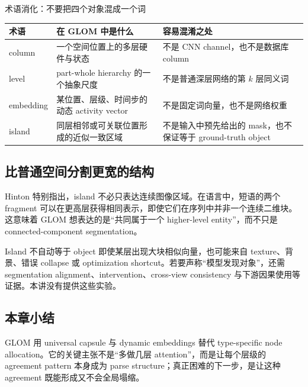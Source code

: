 \begin{knowledgebox}{术语消化：不要把四个对象混成一个词}
\begin{tabularx}{\textwidth}{L{0.21\textwidth}L{0.29\textwidth}X}
\toprule
术语 & 在 GLOM 中是什么 & 容易混淆之处 \\
\midrule
column & 一个空间位置上的多层硬件与状态 & 不是 CNN channel，也不是数据库 column \\
level & part-whole hierarchy 的一个抽象尺度 & 不是普通深层网络的第 $k$ 层同义词 \\
embedding & 某位置、层级、时间步的动态 activity vector & 不是固定词向量，也不是网络权重 \\
island & 同层相邻或可关联位置形成的近似一致区域 & 不是输入中预先给出的 mask，也不保证等于 ground-truth object \\
\bottomrule
\end{tabularx}
\end{knowledgebox}

\subsection{比普通空间分割更宽的结构}

Hinton 特别指出，island 不必只表达连续图像区域。在语言中，短语的两个 fragment 可以在更高层获得相同表示，即使它们在序列中并非一个连续二维块。这意味着 GLOM 想表达的是“共同属于一个 higher-level entity”，而不只是 connected-component segmentation。


\begin{warningbox}{Island 不自动等于 object}
即使某层出现大块相似向量，也可能来自 texture、背景、错误 collapse 或 optimization shortcut。若要声称“模型发现对象”，还需 segmentation alignment、intervention、cross-view consistency 与下游因果使用等证据。本讲没有提供这些实验。
\end{warningbox}

\subsection{本章小结}

GLOM 用 universal capsule 与 dynamic embeddings 替代 type-specific node allocation。它的关键主张不是“多做几层 attention”，而是让每个层级的 agreement pattern 本身成为 parse structure；真正困难的下一步，是让这种 agreement 既能形成又不会全局塌缩。

